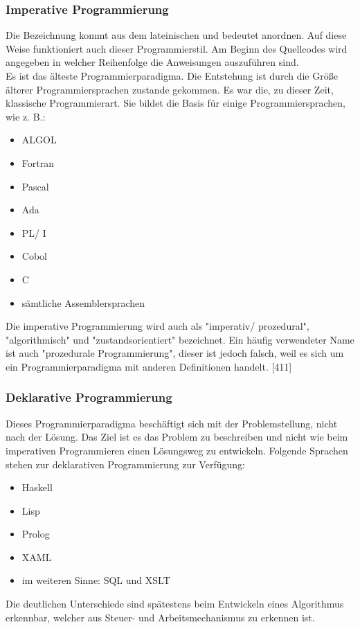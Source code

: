 \documentclass[12pt,a4paper]{report}
\begin{document}
\begin{onehalfspace}
\subsubsection{Imperative Programmierung}
Die Bezeichnung kommt aus dem lateinischen und bedeutet anordnen. Auf diese Weise funktioniert auch dieser Programmierstil. Am Beginn des Quellcodes wird angegeben in welcher Reihenfolge die Anweisungen auszuführen sind.\\

Es ist das älteste Programmierparadigma. Die Entstehung ist durch die Größe älterer Programmiersprachen zustande gekommen. Es war die, zu dieser Zeit, klassische Programmierart. Sie bildet die Basis für einige Programmiersprachen, wie z. B.:
\begin{itemize}
\item ALGOL
\item Fortran
\item Pascal
\item Ada
\item PL/ I
\item Cobol
\item C
\item sämtliche Assemblersprachen
\end{itemize}
Die imperative Programmierung wird auch als "{}imperativ/ prozedural"{}, "{}algorithmisch"{} und "{}zustandsorientiert"{} bezeichnet. Ein häufig verwendeter Name ist auch "{}prozedurale Programmierung"{}, dieser ist jedoch falsch, weil es sich um ein Programmierparadigma mit anderen Definitionen handelt. [411]

\subsubsection{Deklarative Programmierung}
Dieses Programmierparadigma beschäftigt sich mit der Problemstellung, nicht nach der Lösung. Das Ziel ist es das Problem zu beschreiben und nicht wie beim imperativen Programmieren einen Lösungsweg zu entwickeln.
Folgende Sprachen stehen zur deklarativen Programmierung zur Verfügung:
\begin{itemize}
\item Haskell
\item Lisp
\item Prolog
\item XAML
\item im weiteren Sinne: SQL und XSLT
\end{itemize} 
Die deutlichen Unterschiede sind spätestens beim Entwickeln eines Algorithmus erkennbar, welcher aus Steuer- und Arbeitsmechanismus zu erkennen ist.\\


\end{onehalfspace}
\end{document}
